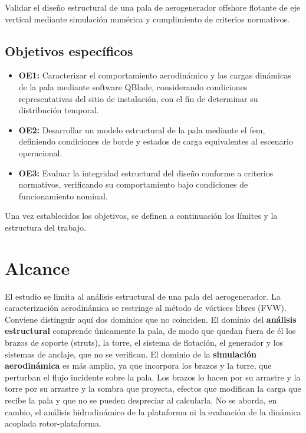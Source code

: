 Validar el diseño estructural de una pala de aerogenerador offshore flotante de eje vertical mediante simulación numérica y cumplimiento de criterios normativos.

\subsection{Objetivos específicos}

\begin{itemize}
    \item \textbf{OE1:} Caracterizar el comportamiento aerodinámico y las cargas dinámicas de la pala mediante software QBlade, considerando condiciones representativas del sitio de instalación, con el fin de determinar su distribución temporal.

    \item \textbf{OE2:} Desarrollar un modelo estructural de la pala mediante el \gls{fem}, definiendo condiciones de borde y estados de carga equivalentes al escenario operacional.

    \item \textbf{OE3:} Evaluar la integridad estructural del diseño conforme a criterios normativos, verificando su comportamiento bajo condiciones de funcionamiento nominal.

\end{itemize}

Una vez establecidos los objetivos, se definen a continuación los límites y la estructura del trabajo.

\section{Alcance}

El estudio se limita al análisis estructural de una pala del aerogenerador. La caracterización aerodinámica se restringe al método de vórtices libres (FVW). Conviene distinguir aquí dos dominios que no coinciden. El dominio del \textbf{análisis estructural} comprende únicamente la pala, de modo que quedan fuera de él los brazos de soporte (struts), la torre, el sistema de flotación, el generador y los sistemas de anclaje, que no se verifican. El dominio de la \textbf{simulación aerodinámica} es más amplio, ya que incorpora los brazos y la torre, que perturban el flujo incidente sobre la pala. Los brazos lo hacen por su arrastre y la torre por su arrastre y la sombra que proyecta, efectos que modifican la carga que recibe la pala y que no se pueden despreciar al calcularla. No se aborda, en cambio, el análisis hidrodinámico de la plataforma ni la evaluación de la dinámica acoplada rotor-plataforma.

